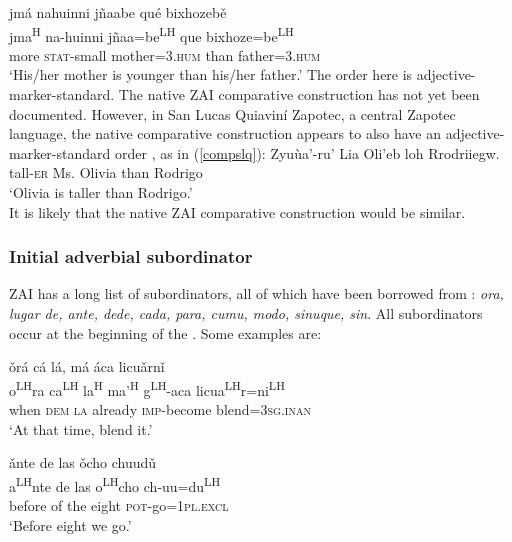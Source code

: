 \ea\label{comp}
\glll jmá nahuinni jñaabe qué bixhozeb\v{e} \\
jma\textsuperscript{H} na-huinni jñaa=be\textsuperscript{LH} que bixhoze=be\textsuperscript{LH} \\
more \textsc{stat}-small mother=\textsc{3.hum} than father=\textsc{3.hum} \\
\glt `His/her mother is younger than his/her father.'
\z
The order here is adjective-marker-standard. The native ZAI comparative construction has not yet been documented. However, in San Lucas Quiavin\'{i} Zapotec, a central Zapotec language, the native comparative construction appears to also have an adjective-marker-standard order \citep{galant2006}, as in (\ref{compslq}):
\ea\label{compslq}
\gll Zyu\`{u}a'-ru' Lia Oli'eb loh Rrodriiegw.\\
tall-\textsc{er} Ms. Olivia than Rodrigo\\
\glt `Olivia is taller than Rodrigo.' \\
\z
It is likely that the native ZAI comparative construction would be similar.


\subsubsection{Initial adverbial subordinator}

ZAI has a long list of  subordinators, all of which have been borrowed from : \textit{ora, lugar de, ante, dede, cada, para, cumu, modo, sinuque, sin}. All  subordinators occur at the beginning of the . Some examples are:

\ea\label{ora}
\glll \v{o}rá cá lá, má áca licu\v{a}rn\v{i}  \\
o\textsuperscript{LH}ra ca\textsuperscript{LH} la\textsuperscript{H} ma'\textsuperscript{H} g\textsuperscript{LH}-aca licua\textsuperscript{LH}r=ni\textsuperscript{LH} \\
when \textsc{dem} \textsc{la} already \textsc{imp}-become blend=\textsc{3sg.inan} \\
\glt `At that time, blend it.'
\z

\ea\label{ante}
\glll \v{a}nte de las \v{o}cho chuud\v{u}  \\
a\textsuperscript{LH}nte de las o\textsuperscript{LH}cho ch-uu=du\textsuperscript{LH} \\
before of the eight \textsc{pot}-go=\textsc{1pl.excl} \\
\glt `Before eight we go.'
\z

